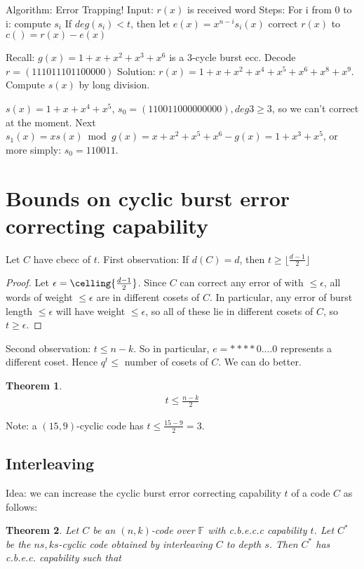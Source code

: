 \documentclass{article}
\newtheorem{thm}{Theorem}
\newcommand{\floor}[1]{\lfloor #1 \rfloor}
\begin{document}
Algorithm: Error Trapping!
Input: $r(x)$ is received word
Steps: For i from 0 to i:
    compute $s_i$
    If $deg(s_i) < t$, then
    let $e(x) = x^{n-i}s_i(x)$
    correct $r(x)$ to $c() = r(x) - e(x)$

Recall:
$g(x) = 1 + x + x^2 + x^3 + x^6$ is a 3-cycle burst ecc.
Decode $r = (1110 1110 1100 000)$
Solution: $r(x) = 1+x+x^2+x^4+x^5+x^6+x^8+x^9$. Compute
$s(x)$ by long division.

$s(x) = 1+x+x^4+x^5$, $s_0 = (1100 1100 0000 000),
deg 3 \geq 3$, so we can't correct at the moment.
Next $s_1(x) = xs(x)\bmod{g(x)} = x+x^2+x^5+x^6-g(x)
= 1 + x^3 + x^5$, or more simply: $s_0 = 110011$.

\section{Bounds on cyclic burst error correcting capability}
Let $C$ have cbecc of $t$. First observation: If $d(C) = d$,
then $t\geq \floor{\frac{d-1}{2}}$
\begin{proof}
    Let $\epsilon = \celling{\frac{d-1}{2}}$. Since $C$ can
    correct any error of with $\leq\epsilon$, all words of
    weight $\leq\epsilon$ are in different cosets of $C$.
    In particular, any error of burst length $\leq\epsilon$ will
    have weight $\leq\epsilon$, so all of these lie in different
    cosets of $C$, so $t\geq\epsilon$.
\end{proof}

Second observation: $t\leq n-k$. So in particular,
$e = **** 0....0$ represents a different coset. Hence
$q^t\leq$ number of cosets of $C$.
We can do better.
\begin{thm}
    \begin{align*}
        t\leq \frac{n-k}{2}
    \end{align*}
\end{thm}

Note: a $(15,9)$-cyclic code has $t\leq \frac{15-9}{2} = 3$.

\subsection{Interleaving}
Idea: we can increase the cyclic burst error correcting
capability $t$ of a code $C$ as follows:

\begin{thm}
    Let $C$ be an $(n,k)$-code over $\mathbb{F}$ with
    c.b.e.c.c capability $t$. Let $C^*$ be the
    $ns, ks$-cyclic code obtained by interleaving $C$ to
    depth $s$. Then $C^*$ has c.b.e.c. capability such that
\end{thm}
\end{document}

